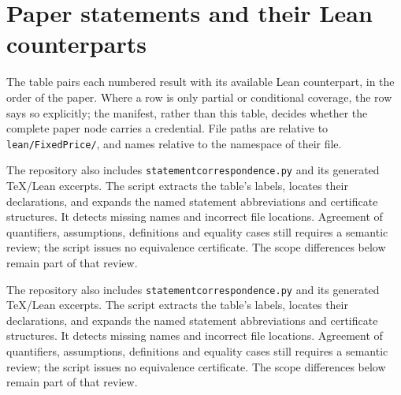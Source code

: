 \documentclass[11pt]{article}
\newcommand{\lean}[1]{\begingroup\def\_{\textunderscore\allowbreak}\texttt{\small #1}\endgroup}
\begin{document}
\section{Paper statements and their Lean counterparts}
\label{s:table}

The table pairs each numbered result with its available Lean counterpart,
in the order of the paper. Where a row is only partial or conditional
coverage, the row says so explicitly; the manifest, rather than this table,
decides whether the complete paper node carries a credential. File paths
are relative to \lean{lean/FixedPrice/}, and names relative to the
namespace of their file.

The repository also includes \lean{statement\_correspondence.py} and
its generated TeX/Lean excerpts. The script extracts the table's labels,
locates their declarations, and expands the named statement abbreviations
and certificate structures. It detects missing names and incorrect file
locations. Agreement of quantifiers, assumptions, definitions and equality
cases still requires a semantic review; the script issues no equivalence
certificate. The scope differences below remain part of that review.

The repository also includes \lean{statement\_correspondence.py} and
its generated TeX/Lean excerpts. The script extracts the table's labels,
locates their declarations, and expands the named statement abbreviations
and certificate structures. It detects missing names and incorrect file
locations. Agreement of quantifiers, assumptions, definitions and equality
cases still requires a semantic review; the script issues no equivalence
certificate. The scope differences below remain part of that review.
\end{document}
